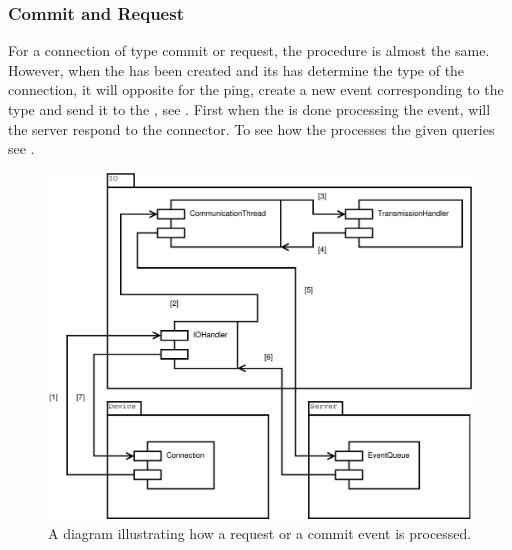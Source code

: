 \subsubsection{Commit and Request}
\label{sec:IOCR}
For a connection of type commit or request, the procedure is almost the same. However, when the  has been created and its  has determine the type of the connection, it will opposite for the ping, create a new event corresponding to the type and send it to the , see .
First when the  is done processing the event, will the server respond to the connector.
To see how the  processes the given queries see .

\begin{figure}[htbp]
	\centering
		\includegraphics[scale=0.30]{images/requestCommit} %
	\caption{A diagram illustrating how a request or a commit event is processed.}
	\label{fig:IOCR}
\end{figure}